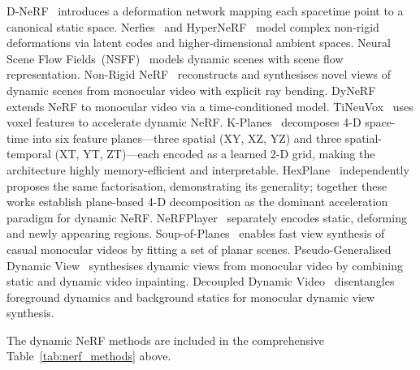 D-NeRF~\citep{pumarola2021dnerf} introduces a deformation network mapping each
spacetime point to a canonical static space.
Nerfies~\citep{park2021nerfies} and
HyperNeRF~\citep{park2021hypernerf} model complex non-rigid deformations via
latent codes and higher-dimensional ambient spaces.
Neural Scene Flow Fields~(NSFF)~\citep{li2021neural_scene_flow} models dynamic
scenes with scene flow representation.
Non-Rigid NeRF~\citep{tretschk2021nonrigid} reconstructs and synthesises
novel views of dynamic scenes from monocular video with explicit ray bending.
DyNeRF~\citep{li2022neural3d} extends NeRF to monocular video via a
time-conditioned model.
TiNeuVox~\citep{fang2022tineuvox} uses voxel features to accelerate dynamic NeRF.
K-Planes~\citep{fridovich2023kplanes} decomposes 4-D space-time into six
feature planes---three spatial (XY, XZ, YZ) and three spatial-temporal
(XT, YT, ZT)---each encoded as a learned 2-D grid, making the architecture
highly memory-efficient and interpretable.
HexPlane~\citep{cao2023hexplane} independently proposes the same factorisation,
demonstrating its generality; together these works establish plane-based
4-D decomposition as the dominant acceleration paradigm for dynamic NeRF.
NeRFPlayer~\citep{song2023nerfplayer} separately encodes static, deforming and
newly appearing regions.
Soup-of-Planes~\citep{du2023soupofplanes} enables fast view synthesis of
casual monocular videos by fitting a set of planar scenes.
Pseudo-Generalised Dynamic View~\citep{zhao2024pgdvs} synthesises dynamic views
from monocular video by combining static and dynamic video inpainting.
Decoupled Dynamic Video~\citep{wang2024decoupleddynamic} disentangles foreground
dynamics and background statics for monocular dynamic view synthesis.

The dynamic NeRF methods are included in the comprehensive
Table~\ref{tab:nerf_methods} above.

